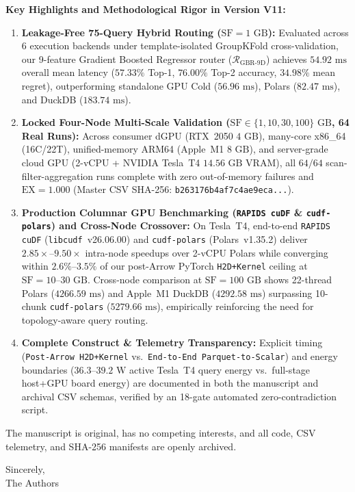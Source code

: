 \documentclass[11pt,a4paper]{article}
\begin{document}
\textbf{Key Highlights and Methodological Rigor in Version V11:}
\begin{enumerate}
\item \textbf{Leakage-Free 75-Query Hybrid Routing ($\text{SF}=1\text{ GB}$):} Evaluated across 6 execution backends under template-isolated GroupKFold cross-validation, our 9-feature Gradient Boosted Regressor router ($\mathcal{R}_{\text{GBR-9D}}$) achieves $54.92\text{ ms}$ overall mean latency ($57.33\%$ Top-1, $76.00\%$ Top-2 accuracy, $34.98\%$ mean regret), outperforming standalone GPU Cold ($56.96\text{ ms}$), Polars ($82.47\text{ ms}$), and DuckDB ($183.74\text{ ms}$).
\item \textbf{Locked Four-Node Multi-Scale Validation ($\text{SF}\in\{1,10,30,100\}\text{ GB}$, 64 Real Runs):} Across consumer dGPU (RTX~2050 $4\text{ GB}$), many-core x86\_64 (16C/22T), unified-memory ARM64 (Apple~M1 $8\text{ GB}$), and server-grade cloud GPU (2-vCPU + NVIDIA Tesla~T4 $14.56\text{ GB}$ VRAM), all $64/64$ scan-filter-aggregation runs complete with zero out-of-memory failures and $\text{EX}=1.000$ (Master CSV SHA-256: \texttt{b263176b4af7c4ae9eca...}).
\item \textbf{Production Columnar GPU Benchmarking (\texttt{RAPIDS cuDF} \& \texttt{cudf-polars}) and Cross-Node Crossover:} On Tesla~T4, end-to-end \texttt{RAPIDS cuDF} (\texttt{libcudf}~v26.06.00) and \texttt{cudf-polars} (Polars~v1.35.2) deliver $2.85\times\text{--}9.50\times$ intra-node speedups over 2-vCPU Polars while converging within $2.6\%\text{--}3.5\%$ of our post-Arrow PyTorch \texttt{H2D+Kernel} ceiling at $\text{SF}=10\text{--}30\text{ GB}$. Cross-node comparison at $\text{SF}=100\text{ GB}$ shows 22-thread Polars ($4266.59\text{ ms}$) and Apple~M1 DuckDB ($4292.58\text{ ms}$) surpassing 10-chunk \texttt{cudf-polars} ($5279.66\text{ ms}$), empirically reinforcing the need for topology-aware query routing.
\item \textbf{Complete Construct \& Telemetry Transparency:} Explicit timing (\texttt{Post-Arrow H2D+Kernel} vs.\ \texttt{End-to-End Parquet-to-Scalar}) and energy boundaries ($36.3\text{--}39.2\text{ W}$ active Tesla~T4 query energy vs.\ full-stage host+GPU board energy) are documented in both the manuscript and archival CSV schemas, verified by an 18-gate automated zero-contradiction script.
\end{enumerate}

The manuscript is original, has no competing interests, and all code, CSV telemetry, and SHA-256 manifests are openly archived.

Sincerely,\\[6pt]
The Authors
\end{document}
